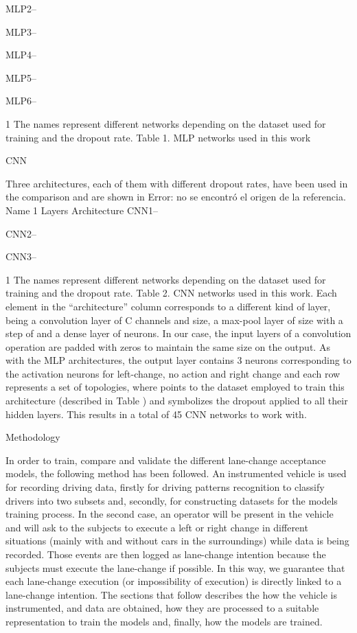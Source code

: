 MLP2--


MLP3--


MLP4--


MLP5--


MLP6--


1 The names represent different networks depending on the dataset used for training and the dropout rate.
Table 1. MLP networks used in this work

CNN

Three architectures, each of them with different dropout rates, have been used in the comparison and are shown in Error: no se encontró el origen de la referencia.
Name 1
Layers
Architecture
CNN1--


CNN2--


CNN3--


1 The names represent different networks depending on the dataset used for training and the dropout rate.
Table 2. CNN networks used in this work.
Each element in the “architecture” column corresponds to a different kind of layer, being  a convolution layer of C channels and  size,  a max-pool layer of  size with a step of  and  a dense layer of  neurons. In our case, the input layers of a convolution operation are padded with zeros to maintain the same  size on the output. As with the MLP architectures, the output layer contains 3 neurons corresponding to the activation neurons for left-change, no action and right change and each row represents a set of topologies, where  points to the dataset employed to train this architecture (described in Table ) and  symbolizes the dropout applied to all their hidden layers. This results in a total of 45 CNN networks to work with.

Methodology

In order to train, compare and validate the different lane-change acceptance models, the following method has been followed. An instrumented vehicle is used for recording driving data, firstly for driving patterns recognition to classify drivers into two subsets and, secondly, for constructing datasets for the models training process. In the second case, an operator will be present in the vehicle and will ask to the subjects to execute a left or right change in different situations (mainly with and without cars in the surroundings) while data is being recorded. Those events are then logged as lane-change intention because the subjects must execute the lane-change if possible. In this way, we guarantee that each lane-change execution (or impossibility of execution) is directly linked to a lane-change intention.
The sections that follow describes the how the vehicle is instrumented, and data are obtained, how they are processed to a suitable representation to train the models and, finally, how the models are trained.